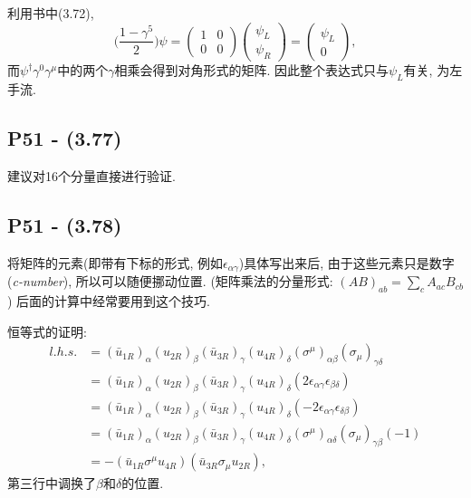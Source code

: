 \documentclass[10pt,b5paper,openany]{book}
\begin{document}
利用书中(3.72), 
\begin{equation}
  \biggl( \frac{1 - \gamma^5}{2} \biggr) \psi = \left( \begin{array}{cc} 1 & 0 \\ 0 & 0 \end{array} \right) \left( \begin{array}{c} \psi_L \\ \psi_R \end{array} \right) = \left( \begin{array}{c} \psi_L \\ 0 \end{array} \right), 
\end{equation}
而$\psi^\dagger \gamma^0 \gamma^\mu$中的两个$\gamma$相乘会得到对角形式的矩阵. 因此整个表达式只与$\psi_L$有关, 为左手流. 

\subsection{P51 - (3.77)}

建议对16个分量直接进行验证. 

\subsection{P51 - (3.78)}

将矩阵的元素(即带有下标的形式, 例如$\epsilon_{\alpha \gamma}$)具体写出来后, 由于这些元素只是数字(\textit{c-number}), 所以可以随便挪动位置. (矩阵乘法的分量形式: $(AB)_{ab} = \sum_c A_{ac} B_{cb}$) 后面的计算中经常要用到这个技巧. 

恒等式的证明: 
\begin{equation}
  \begin{aligned}
    l.h.s. &= (\bar{u}_{1R})_\alpha (u_{2R})_\beta (\bar{u}_{3R})_\gamma (u_{4R})_\delta (\sigma^{\mu})_{\alpha\beta} (\sigma_{\mu})_{\gamma\delta} \\
    &= (\bar{u}_{1R})_\alpha (u_{2R})_\beta (\bar{u}_{3R})_\gamma (u_{4R})_\delta (2\epsilon_{\alpha\gamma} \epsilon_{\beta\delta}) \\
    &= (\bar{u}_{1R})_\alpha (u_{2R})_\beta (\bar{u}_{3R})_\gamma (u_{4R})_\delta (-2\epsilon_{\alpha\gamma} \epsilon_{\delta\beta}) \\
    &= (\bar{u}_{1R})_\alpha (u_{2R})_\beta (\bar{u}_{3R})_\gamma (u_{4R})_\delta (\sigma^{\mu})_{\alpha\delta} (\sigma_{\mu})_{\gamma\beta} (-1) \\
    &= -(\bar{u}_{1R} \sigma^{\mu} u_{4R})(\bar{u}_{3R} \sigma_{\mu} u_{2R}), 
  \end{aligned}
\end{equation}
第三行中调换了$\beta$和$\delta$的位置. 
\end{document}
